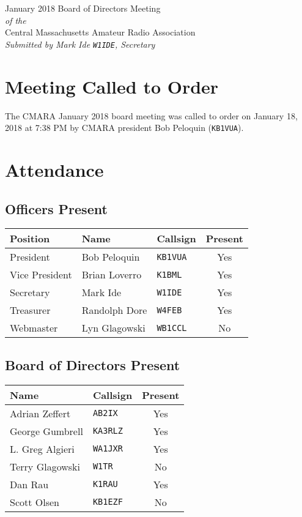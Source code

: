 \documentclass[10pt,letterpaper]{article}
\begin{document}
\begin{center}
{\huge January 2018 Board of Directors Meeting}\\
\emph{of the}\\
{\Large Central Massachusetts Amateur Radio Association}\\
\emph{Submitted by Mark Ide \texttt{W1IDE}, Secretary}
\end{center}

\section{Meeting Called to Order}
The CMARA January 2018 board meeting was called to order on January 18, 2018 at 7:38 PM by CMARA president Bob Peloquin (\texttt{KB1VUA}).

\section{Attendance}

\subsection{Officers Present}
\begin{tabular}{|l|l|l|c|}
  \hline
  \textbf{Position} & \textbf{Name}  & \textbf{Callsign} & \textbf{Present} \\ \hline
  President         & Bob Peloquin   & \texttt{KB1VUA}   & Yes  \\
  Vice President    & Brian Loverro  & \texttt{K1BML}    & Yes \\
  Secretary         & Mark Ide       & \texttt{W1IDE}    & Yes \\
  Treasurer         & Randolph Dore  & \texttt{W4FEB}    & Yes \\
  Webmaster         & Lyn Glagowski  & \texttt{WB1CCL}   & No  \\
  \hline
\end{tabular}

\subsection{Board of Directors Present}
\begin{tabular}{|l|l|c|}
  \hline
  \textbf{Name}   & \textbf{Callsign} & \textbf{Present} \\ \hline
  Adrian Zeffert  & \texttt{AB2IX}    &  Yes \\ \hline
  George Gumbrell & \texttt{KA3RLZ}   &  Yes \\ \hline
  L. Greg Algieri & \texttt{WA1JXR}   &  Yes \\ \hline
  Terry Glagowski & \texttt{W1TR}     &  No  \\ \hline
  Dan Rau         & \texttt{K1RAU}    &  Yes \\ \hline
  Scott Olsen     & \texttt{KB1EZF}   &  No  \\ \hline
\end{tabular}\\
\end{document}
